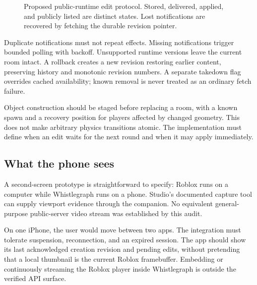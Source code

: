 \documentclass[10pt,letterpaper,twocolumn]{article}
\begin{document}
\begin{figure}[t]
\centering
{}
\caption{Proposed public-runtime edit protocol. Stored, delivered, applied, and publicly listed are distinct states. Lost notifications are recovered by fetching the durable revision pointer.}
\label{fig:revision}
\end{figure}

Duplicate notifications must not repeat effects. Missing notifications trigger bounded polling with backoff. Unsupported runtime versions leave the current room intact. A rollback creates a new revision restoring earlier content, preserving history and monotonic revision numbers. A separate takedown flag overrides cached availability; known removal is never treated as an ordinary fetch failure.

Object construction should be staged before replacing a room, with a known spawn and a recovery position for players affected by changed geometry. This does not make arbitrary physics transitions atomic. The implementation must define when an edit waits for the next round and when it may apply immediately.

\subsection{What the phone sees}
A second-screen prototype is straightforward to specify: Roblox runs on a computer while Whistlegraph runs on a phone. Studio's documented capture tool can supply viewport evidence through the companion. No equivalent general-purpose public-server video stream was established by this audit.

On one iPhone, the user would move between two apps. The integration must tolerate suspension, reconnection, and an expired session. The app should show its last acknowledged creation revision and pending edits, without pretending that a local thumbnail is the current Roblox framebuffer. Embedding or continuously streaming the Roblox player inside Whistlegraph is outside the verified API surface.
\end{document}
